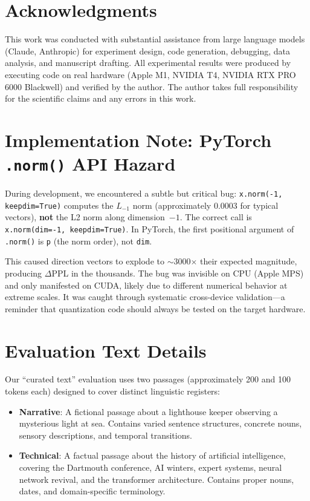 \documentclass[11pt]{article}
\begin{document}
\section*{Acknowledgments}

This work was conducted with substantial assistance from large language models (Claude, Anthropic) for experiment design, code generation, debugging, data analysis, and manuscript drafting. All experimental results were produced by executing code on real hardware (Apple M1, NVIDIA T4, NVIDIA RTX PRO 6000 Blackwell) and verified by the author. The author takes full responsibility for the scientific claims and any errors in this work.

\appendix
\section{Implementation Note: PyTorch \texttt{.norm()} API Hazard}

During development, we encountered a subtle but critical bug: \texttt{x.norm(-1, keepdim=True)} computes the $L_{-1}$ norm (approximately 0.0003 for typical vectors), \textbf{not} the L2 norm along dimension~$-1$. The correct call is \texttt{x.norm(dim=-1, keepdim=True)}. In PyTorch, the first positional argument of \texttt{.norm()} is \texttt{p} (the norm order), not \texttt{dim}.

This caused direction vectors to explode to ${\sim}$3000$\times$ their expected magnitude, producing $\Delta$PPL in the thousands. The bug was invisible on CPU (Apple MPS) and only manifested on CUDA, likely due to different numerical behavior at extreme scales. It was caught through systematic cross-device validation---a reminder that quantization code should always be tested on the target hardware.

\section{Evaluation Text Details}
\label{sec:evaltext}

Our ``curated text'' evaluation uses two passages (approximately 200 and 100 tokens each) designed to cover distinct linguistic registers:

\begin{itemize}[nosep]
  \item \textbf{Narrative}: A fictional passage about a lighthouse keeper observing a mysterious light at sea. Contains varied sentence structures, concrete nouns, sensory descriptions, and temporal transitions.
  \item \textbf{Technical}: A factual passage about the history of artificial intelligence, covering the Dartmouth conference, AI winters, expert systems, neural network revival, and the transformer architecture. Contains proper nouns, dates, and domain-specific terminology.
\end{itemize}
\end{document}
